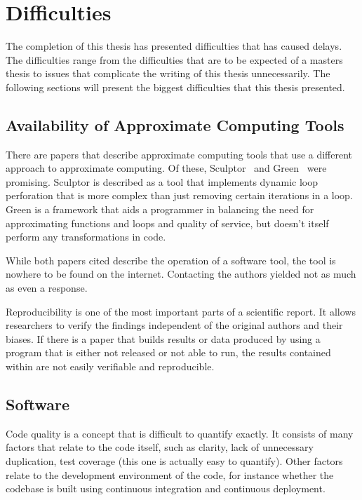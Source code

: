 \section{Difficulties}

The completion of this thesis has presented difficulties that has caused delays. The difficulties range from the difficulties that are to be expected of a masters thesis to issues that complicate the writing of this thesis unnecessarily. The following sections will present the biggest difficulties that this thesis presented. 


\subsection{Availability of Approximate Computing Tools}
There are papers that describe approximate computing tools that use a different approach to approximate computing. Of these, Sculptor~\citep{li2018sculptor} and Green~\citep{baek2010green} were promising. Sculptor is described as a tool that implements dynamic loop perforation that is more complex than just removing certain iterations in a loop. Green is a framework that aids a programmer in balancing the need for approximating functions and loops and quality of service, but doesn't itself perform any transformations in code. 

While both papers cited describe the operation of a software tool, the tool is nowhere to be found on the internet. Contacting the authors yielded not as much as even a response. 

Reproducibility is one of the most important parts of a scientific report.
It allows researchers to verify the findings independent of the original authors and their biases.
If there is a paper that builds results or data produced by using a program that is either not released or not able to run, the results contained within are not easily verifiable and reproducible.

\subsection{Software}
Code quality is a concept that is difficult to quantify exactly.
It consists of many factors that relate to the code itself, such as clarity, lack of unnecessary duplication,
test coverage (this one is actually easy to quantify).
Other factors relate to the development environment of the code, for instance whether the codebase is built using
continuous integration and continuous deployment.

